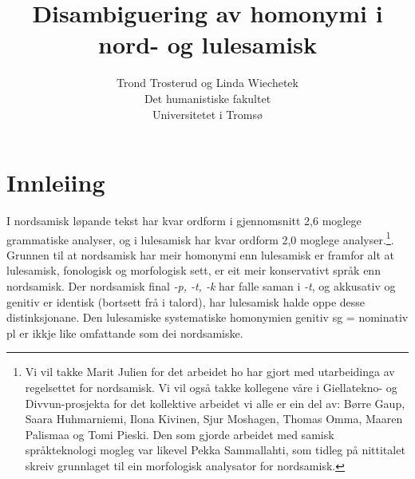 \documentclass[a4paper,nynorsk]{article}
\begin{document}
\title{Disambiguering av homonymi i nord- og lulesamisk}

\author{Trond Trosterud og Linda Wiechetek\\
Det humanistiske fakultet\\
Universitetet i Tromsø}

\maketitle

\tableofcontents %



% 

\section{Innleiing} 


I nordsamisk løpande tekst har kvar ordform i gjennomsnitt 2,6 moglege grammatiske analyser, og i lulesamisk har kvar ordform 2,0 moglege analyser.\footnote{Vi vil takke Marit Julien for det arbeidet ho har gjort med utarbeidinga av regelsettet for nordsamisk. Vi vil også takke kollegene våre i Giellatekno- og Divvun-prosjekta for det kollektive arbeidet vi alle er ein del av: Børre Gaup, Saara Huhmarniemi, Ilona Kivinen, Sjur Moshagen, Thomas Omma, Maaren Palismaa og Tomi Pieski. Den som gjorde arbeidet med samisk språkteknologi mogleg var likevel Pekka Sammallahti, som tidleg på nittitalet skreiv grunnlaget til ein morfologisk analysator for nordsamisk.}. Grunnen til at nordsamisk har meir homonymi enn lulesamisk er framfor alt at lulesamisk, fonologisk og morfologisk sett, er eit meir konservativt språk enn nordsamisk. Der nordsamisk final \emph{-p, -t, -k} har falle saman i \emph{-t}, og akkusativ og genitiv er identisk (bortsett frå i talord), har lulesamisk halde oppe desse distinksjonane. Den lulesamiske systematiske homonymien genitiv sg = nominativ pl er ikkje like omfattande som dei nordsamiske. %
\end{document}
